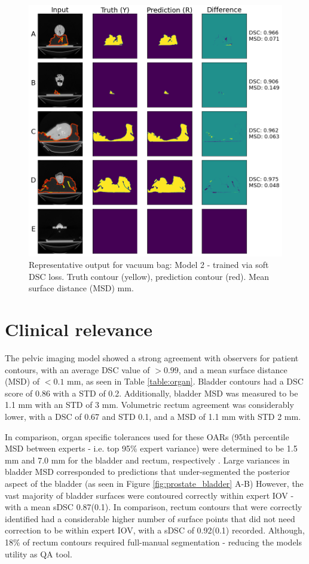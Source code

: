 \begin{figure}[H]
	\begin{center}
		\includegraphics[width=1.0\textwidth]{figures/vet_vacbag}
		\caption{Representative output for vacuum bag: Model 2 - trained via soft DSC loss. Truth contour (yellow), prediction contour (red). Mean surface distance (MSD) mm.}
		\label{fig:vet_vacbag}
	\end{center}
\end{figure}

\section{Clinical relevance}
The pelvic imaging model showed a strong agreement with observers for patient contours, with an average DSC value of $>0.99$, and a mean surface distance (MSD) of $<0.1$ mm, as seen in Table \ref{table:organ}. Bladder contours had a DSC score of 0.86 with a STD of 0.2. Additionally, bladder MSD was measured to be 1.1 mm with an STD of 3 mm. Volumetric rectum agreement was considerably lower, with a DSC of 0.67 and STD 0.1, and a MSD of 1.1 mm with STD 2 mm.


In comparison, organ specific tolerances used for these OARs (95th percentile MSD between experts - i.e. top 95\% expert variance) were determined to be 1.5 mm and 7.0 mm
for the bladder and rectum, respectively \cite{Roach_2019, Nikolov_2018}. Large variances in bladder MSD corresponded to predictions that under-segmented the posterior aspect of the bladder (as seen in Figure \ref{fig:prostate_bladder} A-B) However, the vast majority of bladder surfaces were contoured correctly within expert IOV - with a mean sDSC 0.87(0.1). In comparison, rectum contours that were correctly identified had a considerable higher number of surface points that did not need correction to be within expert IOV, with a sDSC of 0.92(0.1) recorded. Although, 18\% of rectum contours required full-manual segmentation - reducing the models utility as QA tool.

